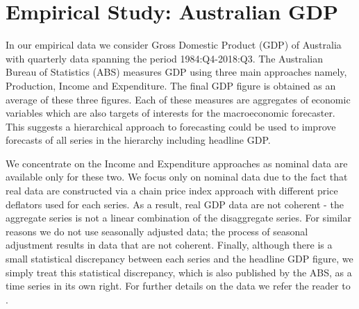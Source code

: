\documentclass[graybox]{svmult}
\begin{document}

\section{Empirical Study: Australian GDP}\label{sec:data}

In our empirical data we consider Gross Domestic Product (GDP) of Australia with quarterly data spanning the period 1984:Q4-2018:Q3. The Australian Bureau of Statistics (ABS) measures GDP using three main approaches namely, Production, Income and Expenditure. The final GDP figure is obtained as an average of these three figures. Each of these measures are aggregates of economic variables which are also targets of interests for the macroeconomic forecaster. This suggests a hierarchical approach to forecasting could be used to improve forecasts of all series in the hierarchy including headline GDP.

We concentrate on the Income and Expenditure approaches as nominal data are available only for these two. We focus only on  nominal data due to the fact that real data are constructed via a chain price index approach with different price deflators used for each series. As a result, real GDP data are not coherent - the aggregate series is not a linear combination of the disaggregate series.  For similar reasons we do not use seasonally adjusted data; the process of seasonal adjustment results in data that are not coherent.  Finally, although there is a small statistical discrepancy between each series and the headline GDP figure, we simply treat this statistical discrepancy, which is also published by the ABS, as a time series in its own right. For further details on the data we refer the reader to \cite{ABS2018}.
\end{document}

